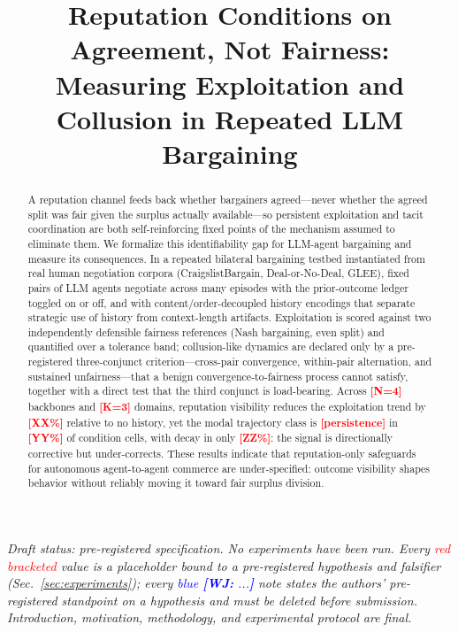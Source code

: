 \documentclass[conference]{IEEEtran}
\newcommand{\wj}[1]{\textcolor{blue}{\textbf{[WJ:} \textit{#1}\textbf{]}}}
\newcommand{\ph}[1]{\textcolor{red}{\textbf{[#1]}}}
\begin{document}
\title{Reputation Conditions on Agreement, Not Fairness:\\
Measuring Exploitation and Collusion in Repeated LLM Bargaining}

\author{
}

\maketitle

\begingroup\small\noindent\textit{Draft status: pre-registered specification.
No experiments have been run. Every \textcolor{red}{red bracketed} value is a
placeholder bound to a pre-registered hypothesis and falsifier
(Sec.~\ref{sec:experiments}); every \textcolor{blue}{blue}
\textnormal{\wj{...}} note states the authors' pre-registered standpoint on a
hypothesis and must be deleted before submission. Introduction, motivation,
methodology, and experimental protocol are final.}\endgroup

\begin{abstract}
A reputation channel feeds back whether bargainers agreed---never whether the
agreed split was fair given the surplus actually available---so persistent
exploitation and tacit coordination are both self-reinforcing fixed points of
the mechanism assumed to eliminate them. We formalize this identifiability gap
for LLM-agent bargaining and measure its consequences. In a repeated bilateral
bargaining testbed instantiated from real human negotiation corpora
(CraigslistBargain, Deal-or-No-Deal, GLEE), fixed pairs of LLM agents
negotiate across many episodes with the prior-outcome ledger toggled on or
off, and with content/order-decoupled history encodings that separate
strategic use of history from context-length artifacts. Exploitation is scored
against two independently defensible fairness references (Nash bargaining,
even split) and quantified over a tolerance band; collusion-like dynamics are
declared only by a pre-registered three-conjunct criterion---cross-pair
convergence, within-pair alternation, and sustained unfairness---that a benign
convergence-to-fairness process cannot satisfy, together with a direct test
that the third conjunct is load-bearing. Across \ph{N=4} backbones and
\ph{K=3} domains, reputation visibility reduces the exploitation trend by
\ph{XX\%} relative to no history, yet the modal trajectory class is
\ph{persistence} in \ph{YY\%} of condition cells, with decay in only
\ph{ZZ\%}: the signal is directionally corrective but under-corrects. These
results indicate that reputation-only safeguards for autonomous agent-to-agent
commerce are under-specified: outcome visibility shapes behavior without
reliably moving it toward fair surplus division.
\end{abstract}
\end{document}
